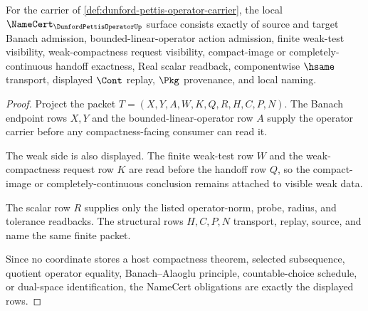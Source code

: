 \begin{theorem}
\label{thm:dunford-pettis-operator-namecert-obligations}
For the carrier of \autoref{def:dunford-pettis-operator-carrier}, the local $\NameCert_{\DunfordPettisOperatorUp}$ surface consists exactly of source and target Banach admission, bounded-linear-operator action admission, finite weak-test visibility, weak-compactness request visibility, compact-image or completely-continuous handoff exactness, Real scalar readback, componentwise $\hsame$ transport, displayed $\Cont$ replay, $\Pkg$ provenance, and local naming.
\end{theorem}
\begin{proof}
Project the packet $T=(X,Y,A,W,K,Q,R,H,C,P,N)$. The Banach endpoint rows $X,Y$ and the bounded-linear-operator row $A$ supply the operator carrier before any compactness-facing consumer can read it.

The weak side is also displayed. The finite weak-test row $W$ and the weak-compactness request row $K$ are read before the handoff row $Q$, so the compact-image or completely-continuous conclusion remains attached to visible weak data.

The scalar row $R$ supplies only the listed operator-norm, probe, radius, and tolerance readbacks. The structural rows $H,C,P,N$ transport, replay, source, and name the same finite packet.

Since no coordinate stores a host compactness theorem, selected subsequence, quotient operator equality, Banach--Alaoglu principle, countable-choice schedule, or dual-space identification, the NameCert obligations are exactly the displayed rows.
\end{proof}


